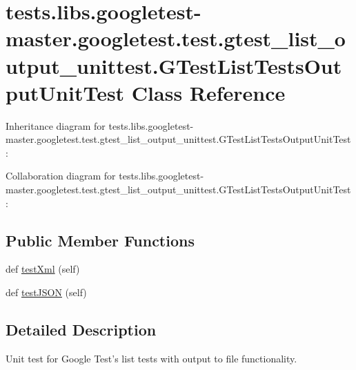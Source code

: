 \hypertarget{classtests_1_1libs_1_1googletest-master_1_1googletest_1_1test_1_1gtest__list__output__unittest_1_1GTestListTestsOutputUnitTest}{}\section{tests.\+libs.\+googletest-\/master.googletest.\+test.\+gtest\+\_\+list\+\_\+output\+\_\+unittest.\+G\+Test\+List\+Tests\+Output\+Unit\+Test Class Reference}
\label{classtests_1_1libs_1_1googletest-master_1_1googletest_1_1test_1_1gtest__list__output__unittest_1_1GTestListTestsOutputUnitTest}


Inheritance diagram for tests.\+libs.\+googletest-\/master.googletest.\+test.\+gtest\+\_\+list\+\_\+output\+\_\+unittest.\+G\+Test\+List\+Tests\+Output\+Unit\+Test\+:


Collaboration diagram for tests.\+libs.\+googletest-\/master.googletest.\+test.\+gtest\+\_\+list\+\_\+output\+\_\+unittest.\+G\+Test\+List\+Tests\+Output\+Unit\+Test\+:
\subsection*{Public Member Functions}
\begin{DoxyCompactItemize}
\item 
def \hyperlink{classtests_1_1libs_1_1googletest-master_1_1googletest_1_1test_1_1gtest__list__output__unittest_1_1GTestListTestsOutputUnitTest_a47c69872a39b1dd8551ab9eed8cbeab4}{test\+Xml} (self)
\item 
def \hyperlink{classtests_1_1libs_1_1googletest-master_1_1googletest_1_1test_1_1gtest__list__output__unittest_1_1GTestListTestsOutputUnitTest_acf6240a75c4f6cfd991faf28d8cd918b}{test\+J\+S\+ON} (self)
\end{DoxyCompactItemize}


\subsection{Detailed Description}
\begin{DoxyVerb}Unit test for Google Test's list tests with output to file functionality.
\end{DoxyVerb}
 

